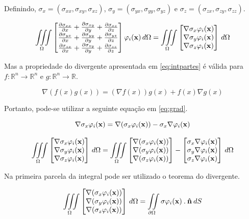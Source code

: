 Definindo, $\sigma_x = (\sigma_{xx}, \sigma_{xy}, \sigma_{xz})$, $\sigma_y = (\sigma_{yx}, \sigma_{yy}, \sigma_{yz})$ e $\sigma_z = (\sigma_{zx}, \sigma_{zy}, \sigma_{zz})$.

\begin{equation}\label{eq:grad}
\omeint{\sstensor \phiix} = \omeint{
\begin{bmatrix}
\nabla \sigma_x \phiix\\ \nabla \sigma_y \phiix \\ \nabla \sigma_z \phiix
\end{bmatrix}}
\end{equation}

Mas a propriedade do divergente apresentada em \ref{eq:intpartes} é válida para $f:\mathbb{R}^n \rightarrow \mathbb{R}^n$ e $g:\mathbb{R}^n \rightarrow \mathbb{R}$.

\begin{equation} \label{eq:intpartes}
\nabla (f(x)g(x)) = (\nabla f(x)) g(x) + f(x)\nabla g(x)
\end{equation}


Portanto, pode-se utilizar a seguinte equação em \ref{eq:grad}.

\begin{equation}
\nabla \sigma_x \phiix = \nabla (\sigma_x \phiix) - \sigma_x \nabla \phiix
\end{equation}


\begin{equation}
\omeint{
\begin{bmatrix}
\nabla \sigma_x \phiix\\ \nabla \sigma_y \phiix \\ \nabla \sigma_z \phiix
\end{bmatrix}} = \omeint{
\begin{bmatrix}
\nabla (\sigma_x \phiix)\\ \nabla (\sigma_y \phiix) \\ \nabla (\sigma_z \phiix)
\end{bmatrix}
-
\begin{bmatrix}
 \sigma_x \nabla \phiix\\  \sigma_y \nabla \phiix \\  \sigma_z \nabla \phiix
\end{bmatrix}
}
\end{equation}

Na primeira parcela da integral pode ser utilizado o teorema do divergente.



\begin{equation}
\omeint{
\begin{bmatrix}
\nabla (\sigma_x \phiix)\\ \nabla (\sigma_y \phiix) \\ \nabla (\sigma_z \phiix)
\end{bmatrix}
}
=
\iint\limits_{\partial \Omega} \sigma \phiix \: . \: \mathbf{\hat{n}} \: dS
\end{equation}

